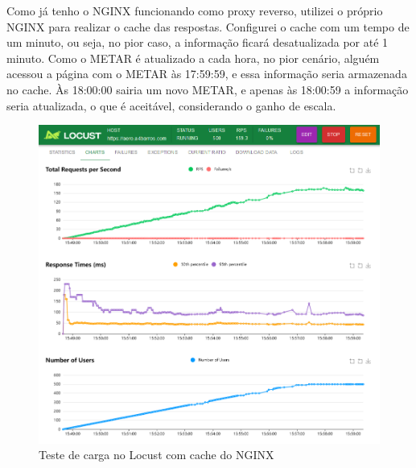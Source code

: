 Como já tenho o NGINX funcionando como proxy reverso, utilizei o próprio NGINX 
para realizar o cache das respostas. Configurei o cache com um tempo de um minuto, 
ou seja, no pior caso, a informação ficará desatualizada por até 1 minuto. Como 
o METAR é atualizado a cada hora, no pior cenário, alguém acessou a página com 
o METAR às 17:59:59, e essa informação seria armazenada no cache. Às 18:00:00 
sairia um novo METAR, e apenas às 18:00:59 a informação seria atualizada, o que
 é aceitável, considerando o ganho de escala.

\begin{figure}[ht]
    \begin{center}
    \includegraphics[width=400pt]{img/locust-cache.png}
    \caption{Teste de carga no Locust com cache do NGINX}
    \label{fig:locust-cache}
    \end{center}
\end{figure}